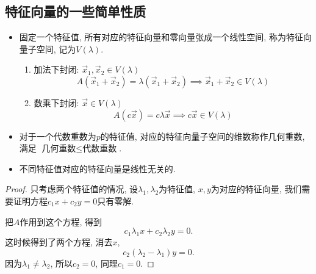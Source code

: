 \subsection{特征向量的一些简单性质}
\begin{itemize}
    \item 固定一个特征值, 所有对应的特征向量和零向量张成一个线性空间, 称为特征向量子空间, 记为$V\left( \lambda \right) $.
    \begin{enumerate}
        \item 加法下封闭: $\vec{x}_1, \vec{x}_2 \in V\left( \lambda \right) $
        \begin{equation}
          A \left( \vec{x}_1 + \vec{x}_2  \right) = \lambda \left( \vec{x}_1 + \vec{x}_2 \right) \implies \vec{x}_1 + \vec{x}_2 \in V\left( \lambda \right)
        \end{equation}
        \item 数乘下封闭: $\vec{x} \in V\left( \lambda \right) $
        \begin{equation}
          A \left( c \vec{x} \right) = c \lambda \vec{x} \implies c \vec{x} \in V\left( \lambda \right)
        \end{equation}
    \end{enumerate}

    \item 对于一个代数重数为$p$的特征值, 对应的特征向量子空间的维数称作几何重数, 满足 $\text{几何重数} \le \text{代数重数}$.
    
    \item 不同特征值对应的特征向量是线性无关的.
\end{itemize}

\begin{proof}
    只考虑两个特征值的情况, 设$\lambda_1, \lambda_2$为特征值, $x,y$为对应的特征向量, 我们需要证明方程$c_1 x + c_2 y = 0$只有零解.

    把$A$作用到这个方程, 得到
    \begin{equation}
        c_1 \lambda_1 x + c_2 \lambda_2 y = 0.
    \end{equation}
    这时候得到了两个方程, 消去$x$,
    \begin{equation}
      c_2 \left( \lambda_2 - \lambda_1 \right) y = 0.
    \end{equation}
    因为$\lambda_1 \neq \lambda_2$, 所以$c_2 = 0$, 同理$c_1 = 0$.
\end{proof}

